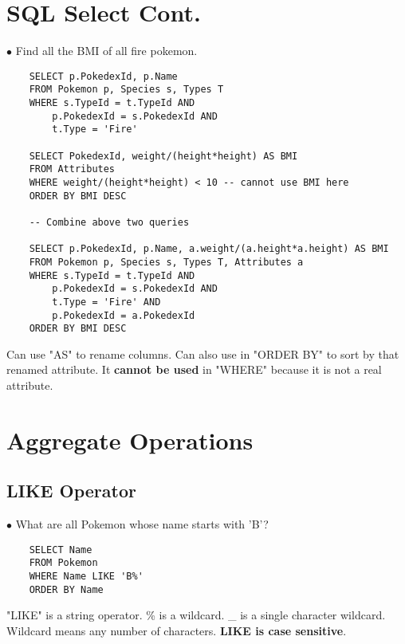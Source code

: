 \documentclass[twoside]{article}
\begin{document}
\section*{SQL Select Cont.}

$\bullet$ Find all the BMI of all fire pokemon.
\begin{verbatim}
    SELECT p.PokedexId, p.Name
    FROM Pokemon p, Species s, Types T
    WHERE s.TypeId = t.TypeId AND
        p.PokedexId = s.PokedexId AND
        t.Type = 'Fire'

    SELECT PokedexId, weight/(height*height) AS BMI
    FROM Attributes
    WHERE weight/(height*height) < 10 -- cannot use BMI here
    ORDER BY BMI DESC

    -- Combine above two queries

    SELECT p.PokedexId, p.Name, a.weight/(a.height*a.height) AS BMI
    FROM Pokemon p, Species s, Types T, Attributes a
    WHERE s.TypeId = t.TypeId AND
        p.PokedexId = s.PokedexId AND
        t.Type = 'Fire' AND
        p.PokedexId = a.PokedexId
    ORDER BY BMI DESC
\end{verbatim}
Can use "AS" to rename columns. Can also use in "ORDER BY" to sort by that 
renamed attribute. It \textbf{cannot be used} in "WHERE" because it is not a 
real attribute.

\section*{Aggregate Operations}

\subsection*{LIKE Operator}

$\bullet$ What are all Pokemon whose name starts with 'B'?
\begin{verbatim}
    SELECT Name
    FROM Pokemon
    WHERE Name LIKE 'B%'
    ORDER BY Name
\end{verbatim}
"LIKE" is a string operator. \% is a wildcard. \_ is a single character 
wildcard. Wildcard means any number of characters. \textbf{LIKE is case 
sensitive}.
\end{document}
